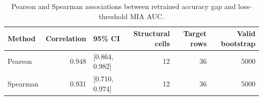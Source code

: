 \begin{table}[t]
\caption{Pearson and Spearman associations between retrained accuracy gap and loss-threshold MIA AUC.}
\label{tab:gap-auc-correlations}
\begin{tabular}{lrlrrr}
\toprule
Method & Correlation & 95\% CI & Structural cells & Target rows & Valid bootstrap \\
\midrule
Pearson & 0.948 & [0.864, 0.982] & 12 & 36 & 5000 \\
Spearman & 0.931 & [0.710, 0.974] & 12 & 36 & 5000 \\
\bottomrule
\end{tabular}
\end{table}
